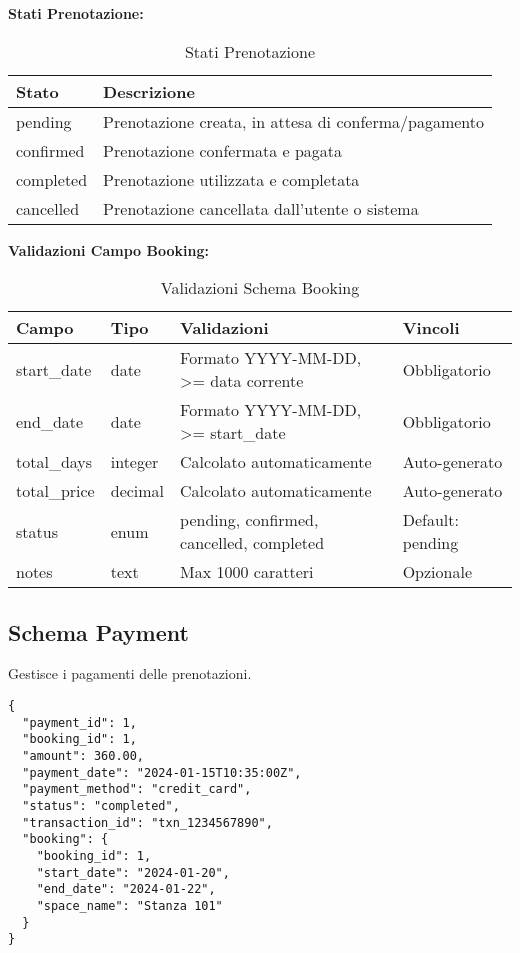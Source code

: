 \textbf{Stati Prenotazione:}
\begin{table}[H]
\centering
\begin{tabular}{@{}lp{10cm}@{}}
\toprule
\textbf{Stato} & \textbf{Descrizione} \\
\midrule
pending & Prenotazione creata, in attesa di conferma/pagamento \\
confirmed & Prenotazione confermata e pagata \\
completed & Prenotazione utilizzata e completata \\
cancelled & Prenotazione cancellata dall'utente o sistema \\
\bottomrule
\end{tabular}
\caption{Stati Prenotazione}
\end{table}

\newpage

\textbf{Validazioni Campo Booking:}
\begin{table}[H]
\centering
\scriptsize
\begin{tabular}{@{}lp{3cm}p{6cm}p{3cm}@{}}
\toprule
\textbf{Campo} & \textbf{Tipo} & \textbf{Validazioni} & \textbf{Vincoli} \\
\midrule
start\_date & date & Formato YYYY-MM-DD, >= data corrente & Obbligatorio \\
end\_date & date & Formato YYYY-MM-DD, >= start\_date & Obbligatorio \\
total\_days & integer & Calcolato automaticamente & Auto-generato \\
total\_price & decimal & Calcolato automaticamente & Auto-generato \\
status & enum & pending, confirmed, cancelled, completed & Default: pending \\
notes & text & Max 1000 caratteri & Opzionale \\
\bottomrule
\end{tabular}
\caption{Validazioni Schema Booking}
\end{table}

\subsection{Schema Payment}
Gestisce i pagamenti delle prenotazioni.

\begin{lstlisting}[caption=Schema Payment]
{
  "payment_id": 1,
  "booking_id": 1,
  "amount": 360.00,
  "payment_date": "2024-01-15T10:35:00Z",
  "payment_method": "credit_card",
  "status": "completed",
  "transaction_id": "txn_1234567890",
  "booking": {
    "booking_id": 1,
    "start_date": "2024-01-20",
    "end_date": "2024-01-22",
    "space_name": "Stanza 101"
  }
}
\end{lstlisting}

